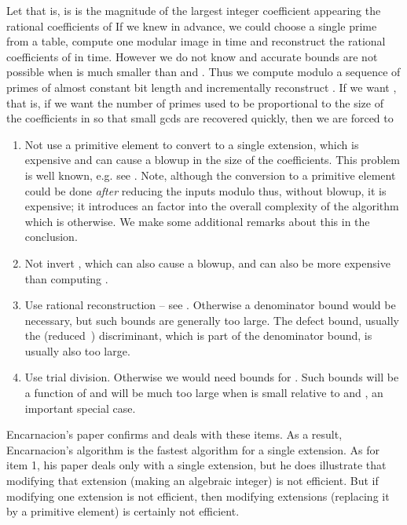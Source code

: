 \documentclass[10pt]{article}
\begin{document}
Let  that is,  is is the magnitude of the largest
integer coefficient appearing the rational coefficients of 
If we knew  in advance, we could choose a single prime  from
a table, compute one modular image in  time
and reconstruct the rational coefficients of  in  time.
However we do not know  and accurate bounds are not possible when 
is much smaller than  and .
Thus we compute  modulo a sequence of primes of almost constant bit length
and incrementally reconstruct .
If we want , that is, if we want
the number of primes used to be proportional to the size of
the coefficients in  so that small gcds are recovered quickly,
then we are forced to
\begin{enumerate}

\item Not use a primitive element to convert to a single extension,
which is expensive and can cause a blowup in the size of the coefficients.
This problem is well known, e.g. see \cite{Abbott}.  Note, although the conversion
to a primitive element could be done {\em after} reducing the inputs modulo 
thus, without blowup, it is expensive; it introduces an  factor
into the overall complexity of the algorithm which is  otherwise.
We make some additional remarks about this in the conclusion.

\item Not invert , which can also cause a blowup, and can
also be more expensive than computing .

\item Use rational reconstruction -- see \cite{Collins,MQRR,Pan,Wang}.
Otherwise a denominator bound would be necessary, but such bounds
are generally too large. The defect bound, usually the
(reduced~\cite{Bradford}) discriminant, which is part of the denominator
bound, is usually also too large.

\item Use trial division.  Otherwise we would need bounds for .
Such bounds will be a function of  and will be much too
large when  is small relative to  and , an important
special case.

\end{enumerate}
Encarnacion's paper confirms and deals with these items.
As a result, Encarnacion's algorithm is the fastest algorithm
for a single extension.
As for item 1, his paper deals only with a single extension, but he
does illustrate that modifying that extension (making 
an algebraic integer) is not efficient. But if modifying one
extension  is not efficient, then modifying  extensions
(replacing it by a primitive element) is certainly not efficient.
\end{document}
